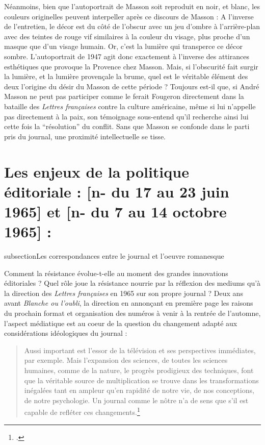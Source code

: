Néanmoins, bien que l’autoportrait de Masson soit reproduit en noir, et blanc, les couleurs originelles peuvent interpeller après ce discours de Masson : A l’inverse de l’entretien, le décor est du côté de l’obscur avec un jeu d’ombre à l’arrière-plan avec des teintes de rouge vif similaires à la couleur du visage, plus proche d’un masque que d’un visage humain. Or, c’est la lumière qui transperce ce décor sombre. L’autoportrait de 1947 agit donc exactement à l’inverse des attirances esthétiques que provoque la Provence chez Masson. Mais, si l’obscurité fait surgir la lumière, et la lumière provençale la brume, quel est le véritable élément des deux l’origine du désir du Masson de cette période ? Toujours est-il que, si André Masson ne peut pas participer comme le ferait Fougeron directement dans la bataille des \emph{Lettres françaises }contre la culture américaine, même si lui n’appelle pas directement à la paix, son témoignage sous-entend qu’il recherche ainsi lui cette fois la \enquote{résolution} du conflit. Sans que Masson se confonde dans le parti pris du journal, une proximité intellectuelle se tisse.  

\section{Les enjeux de la politique éditoriale : [n- du 17 au 23 juin 1965] et  [n- du 7 au 14 octobre 1965] :}

subsection{Les correspondances entre le journal et l'oeuvre romanesque}

Comment la résistance évolue-t-elle au moment des grandes innovations éditoriales ? Quel rôle joue la résistance nourrie par la réflexion des mediums qu’à la direction des \emph{Lettres françaises} en 1965 sur son propre journal ? Deux ans avant \emph{Blanche ou l’oubli}, la direction en annonçant en première page les raisons du prochain format et organisation des numéros à venir à la rentrée de l’automne, l’aspect médiatique est au coeur de la question du changement adapté aux considérations idéologiques du journal :

\begin{quote}
Aussi important est l’essor de la télévision et ses perspectives immédiates, par exemple. Mais l’expansion des sciences, de toutes les sciences humaines, comme de la nature, le progrès prodigieux des techniques, font que la véritable source de multiplication se trouve dans les transformations inégalées tant en ampleur qu’en rapidité de notre vie, de nos conceptions, de notre psychologie. Un journal comme le nôtre n’a de sens que s’il est capable de refléter ces changements.\footcite{nouvelleformule}\end{quote}


